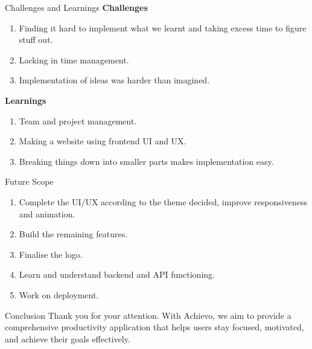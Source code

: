 \documentclass{beamer}
\begin{document}
\begin{frame}{Challenges and Learnings}
    \textbf{Challenges}
    \begin{enumerate}
        \item Finding it hard to implement what we learnt and taking excess time to figure stuff out.
        \item Lacking in time management.
        \item Implementation of ideas was harder than imagined.
    \end{enumerate}
    \textbf{Learnings}
    \begin{enumerate}
        \item Team and project management.
        \item Making a website using frontend UI and UX.
        \item Breaking things down into smaller parts makes implementation easy.
    \end{enumerate}
\end{frame}

\begin{frame}{Future Scope}
    \begin{enumerate}
        \item Complete the UI/UX according to the theme decided, improve responsiveness and animation.
        \item Build the remaining features.
        \item Finalise the logo.
        \item Learn and understand backend and API functioning.
        \item Work on deployment.
    \end{enumerate}
\end{frame}

\begin{frame}{Conclusion}
    Thank you for your attention. With Achievo, we aim to provide a comprehensive productivity application that helps users stay focused, motivated, and achieve their goals effectively.
\end{frame}
\end{document}
